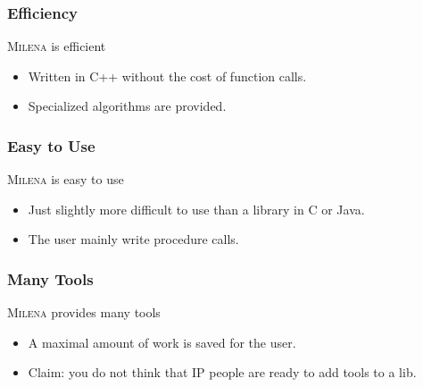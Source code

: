 \documentclass{beamer}
\newcommand{\mln}{\textsc{Milena}\xspace}
\begin{document}
\begin{frame}
  \frametitle{Efficiency}

  \begin{block}{\mln is efficient}
    \begin{itemize}
    \item Written in C++ without the cost of function calls.
    \item Specialized algorithms are provided.
    \end{itemize}
  \end{block}


\end{frame}


\begin{frame}
  \frametitle{Easy to Use}

  \begin{block}{\mln is easy to use}
    \begin{itemize}
    \item Just slightly more difficult to use than a library in C or Java.
    \item The user mainly write procedure calls.
    \end{itemize}
  \end{block}


\end{frame}


\begin{frame}
  \frametitle{Many Tools}

  \begin{block}{\mln provides many tools}
    \begin{itemize}
    \item A maximal amount of work is saved for the user.
    \item Claim: you do not think that IP people are ready to add tools to a lib.
    \end{itemize}
  \end{block}


\end{frame}




\end{document}
